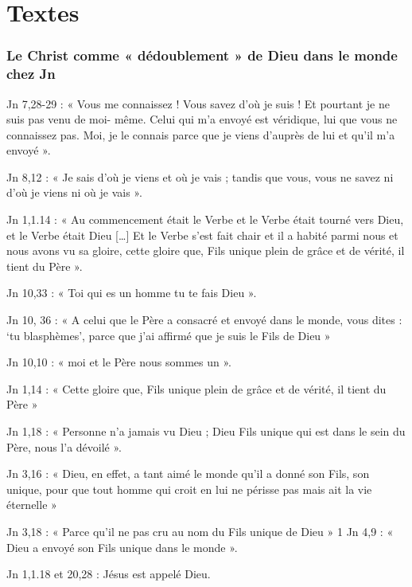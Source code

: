 \hypertarget{textes}{%
\section{Textes}\label{textes}}

 



 

\hypertarget{le-christ-comme-duxe9doublement-de-dieu-dans-le-monde-chez-jn}{%
\subsubsection{Le Christ comme « dédoublement » de Dieu dans le monde
chez
Jn}\label{le-christ-comme-duxe9doublement-de-dieu-dans-le-monde-chez-jn}}

 
Jn 7,28-29 : « Vous me connaissez ! Vous savez d'où je suis ! Et
pourtant je ne suis pas venu de moi- même. Celui qui m'a envoyé est
véridique, lui que vous ne connaissez pas. Moi, je le connais parce que
je viens d'auprès de lui et qu'il m'a envoyé ».

Jn 8,12 : « Je sais d'où je viens et où je vais ; tandis que vous, vous
ne savez ni d'où je viens ni où je vais ».

Jn 1,1.14 : « Au commencement était le Verbe et le Verbe était tourné
vers Dieu, et le Verbe était Dieu {[}\ldots{]} Et le Verbe s'est fait
chair et il a habité parmi nous et nous avons vu sa gloire, cette gloire
que, Fils unique plein de grâce et de vérité, il tient du Père ».

Jn 10,33 : « Toi qui es un homme tu te fais Dieu ».

Jn 10, 36 : « A celui que le Père a consacré et envoyé dans le monde,
vous dites : `tu blasphèmes', parce que j'ai affirmé que je suis le Fils
de Dieu »

Jn 10,10 : « moi et le Père nous sommes un ».

Jn 1,14 : « Cette gloire que, Fils unique plein de grâce et de vérité,
il tient du Père »

Jn 1,18 : « Personne n'a jamais vu Dieu ; Dieu Fils unique qui est dans
le sein du Père, nous l'a dévoilé ».

Jn 3,16 : « Dieu, en effet, a tant aimé le monde qu'il a donné son Fils,
son unique, pour que tout homme qui croit en lui ne périsse pas mais ait
la vie éternelle »

Jn 3,18 : « Parce qu'il ne pas cru au nom du Fils unique de Dieu » 1 Jn
4,9 : « Dieu a envoyé son Fils unique dans le monde ».

Jn 1,1.18 et 20,28 : Jésus est appelé Dieu.
 
